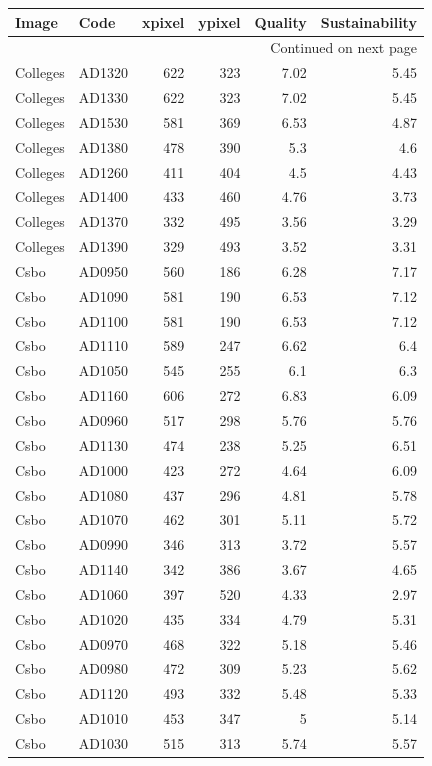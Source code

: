\documentclass[article,10pt,microtype]{article}
\begin{document}
\begin{longtable}{llrrrr}
\label{administrative}
\\
Image & Code & xpixel & ypixel & Quality & Sustainability\\
\hline
\endhead
\hline\multicolumn{6}{r}{Continued on next page} \\
\endfoot
\endlastfoot
Colleges & AD1320 & 622 & 323 & 7.02 & 5.45\\
Colleges & AD1330 & 622 & 323 & 7.02 & 5.45\\
Colleges & AD1530 & 581 & 369 & 6.53 & 4.87\\
Colleges & AD1380 & 478 & 390 & 5.3 & 4.6\\
Colleges & AD1260 & 411 & 404 & 4.5 & 4.43\\
Colleges & AD1400 & 433 & 460 & 4.76 & 3.73\\
Colleges & AD1370 & 332 & 495 & 3.56 & 3.29\\
Colleges & AD1390 & 329 & 493 & 3.52 & 3.31\\
Csbo & AD0950 & 560 & 186 & 6.28 & 7.17\\
Csbo & AD1090 & 581 & 190 & 6.53 & 7.12\\
Csbo & AD1100 & 581 & 190 & 6.53 & 7.12\\
Csbo & AD1110 & 589 & 247 & 6.62 & 6.4\\
Csbo & AD1050 & 545 & 255 & 6.1 & 6.3\\
Csbo & AD1160 & 606 & 272 & 6.83 & 6.09\\
Csbo & AD0960 & 517 & 298 & 5.76 & 5.76\\
Csbo & AD1130 & 474 & 238 & 5.25 & 6.51\\
Csbo & AD1000 & 423 & 272 & 4.64 & 6.09\\
Csbo & AD1080 & 437 & 296 & 4.81 & 5.78\\
Csbo & AD1070 & 462 & 301 & 5.11 & 5.72\\
Csbo & AD0990 & 346 & 313 & 3.72 & 5.57\\
Csbo & AD1140 & 342 & 386 & 3.67 & 4.65\\
Csbo & AD1060 & 397 & 520 & 4.33 & 2.97\\
Csbo & AD1020 & 435 & 334 & 4.79 & 5.31\\
Csbo & AD0970 & 468 & 322 & 5.18 & 5.46\\
Csbo & AD0980 & 472 & 309 & 5.23 & 5.62\\
Csbo & AD1120 & 493 & 332 & 5.48 & 5.33\\
Csbo & AD1010 & 453 & 347 & 5 & 5.14\\
Csbo & AD1030 & 515 & 313 & 5.74 & 5.57\\

\end{longtable}
\end{document}
